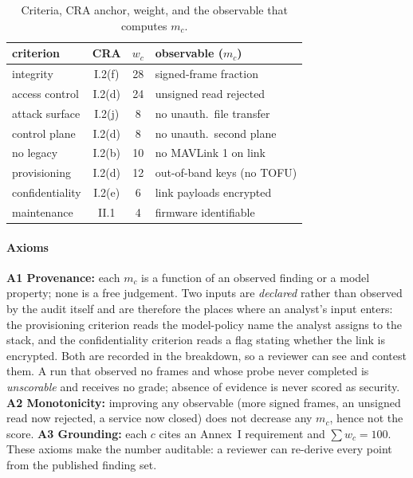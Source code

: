 \documentclass[conference]{IEEEtran}
\begin{document}
\begin{table}[t]
\caption{Criteria, CRA anchor, weight, and the observable that computes $m_c$.}
\label{tab:crit}
\centering\footnotesize\setlength{\tabcolsep}{3pt}
\begin{tabular}{@{}lccp{2.6cm}@{}}
\toprule
criterion & CRA & $w_c$ & observable ($m_c$) \\
\midrule
integrity        & I.2(f) & 28 & signed-frame fraction \\
access control   & I.2(d) & 24 & unsigned read rejected \\
attack surface   & I.2(j) & 8  & no unauth.\ file transfer \\
control plane    & I.2(d) & 8  & no unauth.\ second plane \\
no legacy        & I.2(b) & 10 & no MAVLink 1 on link \\
provisioning     & I.2(d) & 12 & out-of-band keys (no TOFU) \\
confidentiality  & I.2(e) & 6  & link payloads encrypted \\
maintenance      & II.1   & 4  & firmware identifiable \\
\bottomrule
\end{tabular}
\end{table}

\paragraph{Axioms} \textbf{A1 Provenance:} each $m_c$ is a function of an observed
finding or a model property; none is a free judgement. Two inputs are
\emph{declared} rather than observed by the audit itself and are therefore the
places where an analyst's input enters: the provisioning criterion reads the
model-policy name the analyst assigns to the stack, and the confidentiality
criterion reads a flag stating whether the link is encrypted. Both are recorded
in the breakdown, so a reviewer can see and contest them. A run that observed no
frames and whose probe never completed is \emph{unscorable} and receives no
grade; absence of evidence is never scored as security. \textbf{A2 Monotonicity:}
improving any observable (more signed frames, an unsigned read now rejected, a
service now closed) does not decrease any $m_c$, hence not the score.
\textbf{A3 Grounding:} each $c$ cites an Annex~I requirement and
$\sum w_c = 100$. These axioms make the number auditable: a reviewer can re-derive
every point from the published finding set.
\end{document}
